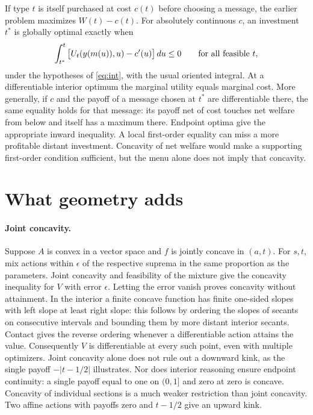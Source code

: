 \documentclass[11pt]{article}
\begin{document}
If type \(t\) is itself purchased at cost \(c(t)\) before choosing a message, the earlier problem maximizes \(W(t)-c(t)\). For absolutely continuous \(c\), an investment \(t^*\) is globally optimal exactly when
\[
 \int_{t^*}^{t}\big[U_t(y(m(u)),u)-c'(u)\big]\,du\leq0
 \qquad\hbox{for all feasible }t,
\]
under the hypotheses of \eqref{eq:int}, with the usual oriented integral. At a differentiable interior optimum the marginal utility equals marginal cost. More generally, if \(c\) and the payoff of a message chosen at \(t^*\) are differentiable there, the same equality holds for that message: its payoff net of cost touches net welfare from below and itself has a maximum there. Endpoint optima give the appropriate inward inequality. A local first-order equality can miss a more profitable distant investment. Concavity of net welfare would make a supporting first-order condition sufficient, but the menu alone does not imply that concavity.

\section{What geometry adds}

\paragraph{Joint concavity.}
Suppose \(A\) is convex in a vector space and \(f\) is jointly concave in \((a,t)\). For \(s,t\), mix actions within \(\epsilon\) of the respective suprema in the same proportion as the parameters. Joint concavity and feasibility of the mixture give the concavity inequality for \(V\) with error \(\epsilon\). Letting the error vanish proves concavity without attainment. In the interior a finite concave function has finite one-sided slopes with left slope at least right slope: this follows by ordering the slopes of secants on consecutive intervals and bounding them by more distant interior secants. Contact gives the reverse ordering whenever a differentiable action attains the value. Consequently \(V\) is differentiable at every such point, even with multiple optimizers. Joint concavity alone does not rule out a downward kink, as the single payoff \(-|t-1/2|\) illustrates. Nor does interior reasoning ensure endpoint continuity: a single payoff equal to one on \((0,1]\) and zero at zero is concave. Concavity of individual sections is a much weaker restriction than joint concavity. Two affine actions with payoffs zero and \(t-1/2\) give an upward kink.
\end{document}
